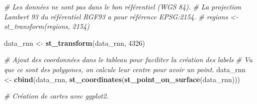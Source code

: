 \documentclass[
  french,
]{book}
\newenvironment{Shaded}{\begin{snugshade}}{\end{snugshade}}
\newcommand{\CommentTok}[1]{\textcolor[rgb]{0.56,0.35,0.01}{\textit{#1}}}
\newcommand{\DecValTok}[1]{\textcolor[rgb]{0.00,0.00,0.81}{#1}}
\newcommand{\KeywordTok}[1]{\textcolor[rgb]{0.13,0.29,0.53}{\textbf{#1}}}
\newcommand{\NormalTok}[1]{#1}
\newcommand{\StringTok}[1]{\textcolor[rgb]{0.31,0.60,0.02}{#1}}
\begin{document}
\begin{Shaded}
\begin{Highlighting}[]
\CommentTok{\# Les données ne sont pas dans le bon référentiel (WGS 84).}
\CommentTok{\# La projection Lambert 93 du référentiel RGF93 a pour référence EPSG:2154.}
\CommentTok{\# regions \textless{}{-} st\_transform(regions, 2154)}

\NormalTok{data\_rnn \textless{}{-}}\StringTok{ }\KeywordTok{st\_transform}\NormalTok{(data\_rnn, }\DecValTok{4326}\NormalTok{)}

\CommentTok{\# Ajout des coordonnées dans le tableau pour faciliter la création des labels}
\CommentTok{\# Vu que ce sont des polygones, on calcule leur centre pour avoir un point.}
\NormalTok{data\_rnn \textless{}{-}}\StringTok{ }\KeywordTok{cbind}\NormalTok{(data\_rnn, }\KeywordTok{st\_coordinates}\NormalTok{(}\KeywordTok{st\_point\_on\_surface}\NormalTok{(data\_rnn)))}

\CommentTok{\# Création de cartes avec ggplot2.}


\end{Highlighting}
\end{Shaded}
\end{document}
